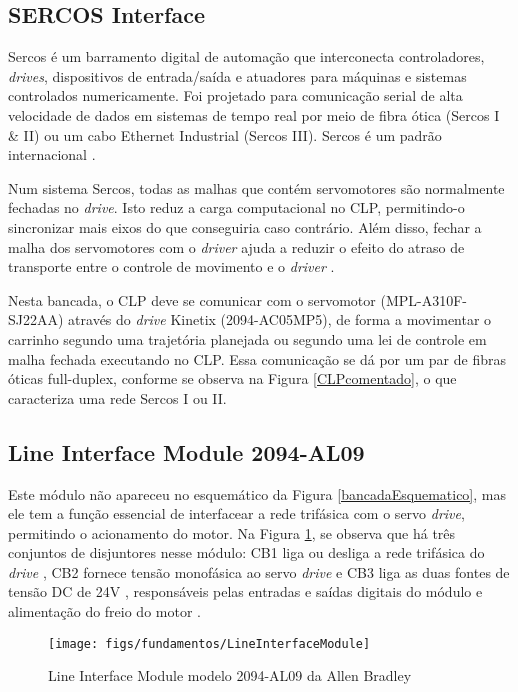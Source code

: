 \subsection{SERCOS Interface}

Sercos é um barramento digital de automação que interconecta controladores, \textit{drives}, dispositivos de entrada/saída e atuadores para máquinas e sistemas controlados numericamente. Foi projetado para comunicação serial de alta velocidade de dados em sistemas de tempo real por meio de fibra ótica (Sercos I \& II) ou um cabo Ethernet Industrial (Sercos III). Sercos é um padrão internacional \cite{sercos}.

Num sistema Sercos, todas as malhas que contém servomotores são normalmente fechadas no \textit{drive}. Isto reduz a carga computacional no CLP, permitindo-o sincronizar mais eixos do que conseguiria caso contrário. Além disso, fechar a malha dos servomotores com o \textit{driver} ajuda a reduzir o efeito do atraso de transporte entre o controle de movimento e o \textit{driver} \cite{sercos}.

Nesta bancada, o CLP deve se comunicar com o servomotor (MPL-A310F-SJ22AA) através do \textit{drive} Kinetix (2094-AC05MP5), de forma a movimentar o carrinho segundo uma trajetória planejada ou segundo uma lei de controle em malha fechada executando no CLP. Essa comunicação se dá por um par de fibras óticas full-duplex, conforme se observa na Figura \ref{CLPcomentado}, o que caracteriza uma rede Sercos I ou II.

\subsection{Line Interface Module 2094-AL09}

Este módulo não apareceu no esquemático da Figura \ref{bancadaEsquematico}, mas ele tem a função essencial de interfacear a rede trifásica com o servo \textit{drive}, permitindo o acionamento do motor. Na Figura \ref{LineInterfaceModule}, se observa que há três conjuntos de disjuntores nesse módulo: CB1 \textendash{} liga ou desliga a rede trifásica do \textit{drive}  \textendash{}, CB2 \textendash{} fornece tensão monofásica ao servo \textit{drive} \textendash{} e CB3 \textendash{} liga as duas fontes de tensão DC de 24V \textendash{}, responsáveis pelas entradas e saídas digitais do módulo e alimentação do freio do motor \cite{redytton}.

\begin{figure}[!ht]
  \centering
    \texttt{[image: figs/fundamentos/LineInterfaceModule]}
    \caption{Line Interface Module modelo 2094-AL09 da Allen Bradley \cite{redytton}\label{LineInterfaceModule}}
\end{figure}

